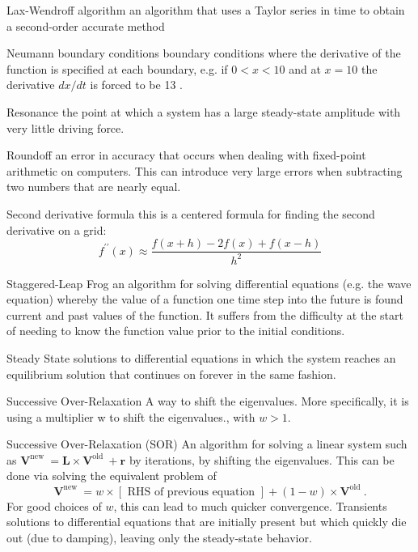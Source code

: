 Lax-Wendroff algorithm an algorithm that uses a Taylor series in time to obtain a second-order accurate method

Neumann boundary conditions boundary conditions where the derivative of the function is specified at each boundary, e.g. if $0<x<10$ and at $x=10$ the derivative $d x / d t$ is forced to be 13 .

Resonance the point at which a system has a large steady-state amplitude with very little driving force.

Roundoff an error in accuracy that occurs when dealing with fixed-point arithmetic on computers. This can introduce very large errors when subtracting two numbers that are nearly equal.

Second derivative formula this is a centered formula for finding the second derivative on a grid:
$$
f^{\prime \prime}(x) \approx \frac{f(x+h)-2 f(x)+f(x-h)}{h^{2}}
$$

Staggered-Leap Frog an algorithm for solving differential equations (e.g. the wave equation) whereby the value of a function one time step into the future is found current and past values of the function. It suffers from the difficulty at the start of needing to know the function value prior to the initial conditions.

Steady State solutions to differential equations in which the system reaches an equilibrium solution that continues on forever in the same fashion.

Successive Over-Relaxation A way to shift the eigenvalues. More specifically, it is using a multiplier w to shift the eigenvalues., with $w>1$.

Successive Over-Relaxation (SOR) An algorithm for solving a linear system such as $\mathbf{V}^{\text {new }}=\mathbf{L} \times \mathbf{V}^{\text {old }}+\mathbf{r}$ by iterations, by shifting the eigenvalues. This can be done via solving the equivalent problem of
$$
\mathbf{V}^{\text {new }}=w \times[\text { RHS of previous equation }]+(1-w) \times \mathbf{V}^{\text {old }} .
$$
For good choices of $w$, this can lead to much quicker convergence.
Transients solutions to differential equations that are initially present but which quickly die out (due to damping), leaving only the steady-state behavior.
